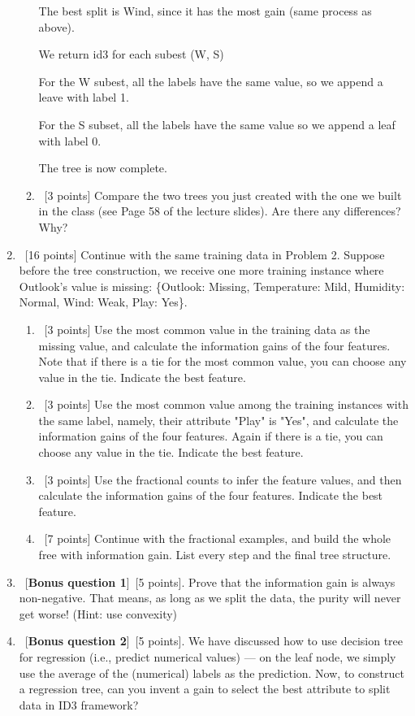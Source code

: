\documentclass[12pt, fullpage,letterpaper]{article}
\begin{document}
\begin{enumerate}
\begin{enumerate}
The best split is Wind, since it has the most gain (same process as above).

We return id3 for each subest (W, S)

For the W subest, all the labels have the same value, so we append a leave with label 1.

For the S subset, all the labels have the same value so we append a leaf with label 0.

The tree is now complete.

	\item~[3 points] Compare the two trees you just created with the one we built in the class (see Page 58 of the lecture slides). Are there any differences? Why? 
\end{enumerate}

\item~[16 points] Continue with the same training data in Problem 2. Suppose before the tree construction, we receive one more training instance where Outlook's value is missing: \{Outlook: Missing, Temperature: Mild, Humidity: Normal, Wind: Weak, Play: Yes\}. 
\begin{enumerate}
\item~[3 points] Use the most common value in the training data as the missing  value, and calculate the information gains of the four features. Note that if there is a tie for the most common value, you can choose any value in the tie.  Indicate the best feature. 
\item~[3 points] Use the most common value among the  training instances with the same label, namely, their attribute "Play" is "Yes", and calculate the information gains of the four features. Again if there is a tie, you can choose any value in the tie. Indicate the best feature.
\item~[3 points] Use the fractional counts to infer the feature values, and then calculate the information gains of the four features. Indicate the best feature.
\item~[7 points] Continue with the fractional examples, and build the whole free with information gain. List every step and the final tree structure.  

\end{enumerate}
\item ~[\textbf{Bonus question 1}]~[5 points].  Prove that the information gain is always non-negative.  That means, as long as we split the data, the purity will never get worse! (Hint: use convexity)
\item ~[\textbf{Bonus question 2}]~[5 points].  We have discussed how to use decision tree for regression (i.e., predict numerical values) --- on the leaf node, we simply use the average of the (numerical) labels as the prediction.  Now, to construct a regression tree, can you invent a gain to select the best attribute to split data in ID3 framework?

\end{enumerate}
\end{document}
